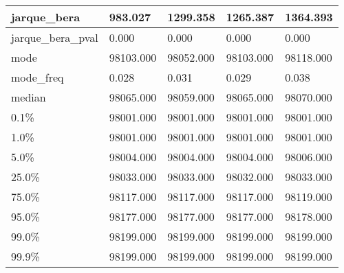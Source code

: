 \begin{table}[H]
\begin{tabular}{|l|m{10em}|m{10em}|m{10em}|m{10em}|}
\hline jarque\_bera & 983.027 & 1299.358 & 1265.387 & 1364.393 \\
\hline jarque\_bera\_pval & 0.000 & 0.000 & 0.000 & 0.000 \\
\hline mode & 98103.000 & 98052.000 & 98103.000 & 98118.000 \\
\hline mode\_freq & 0.028 & 0.031 & 0.029 & 0.038 \\
\hline median & 98065.000 & 98059.000 & 98065.000 & 98070.000 \\
\hline 0.1\% & 98001.000 & 98001.000 & 98001.000 & 98001.000 \\
\hline 1.0\% & 98001.000 & 98001.000 & 98001.000 & 98001.000 \\
\hline 5.0\% & 98004.000 & 98004.000 & 98004.000 & 98006.000 \\
\hline 25.0\% & 98033.000 & 98033.000 & 98032.000 & 98033.000 \\
\hline 75.0\% & 98117.000 & 98117.000 & 98117.000 & 98119.000 \\
\hline 95.0\% & 98177.000 & 98177.000 & 98177.000 & 98178.000 \\
\hline 99.0\% & 98199.000 & 98199.000 & 98199.000 & 98199.000 \\
\hline 99.9\% & 98199.000 & 98199.000 & 98199.000 & 98199.000 \\
\hline
\end{tabular}
\end{table}
